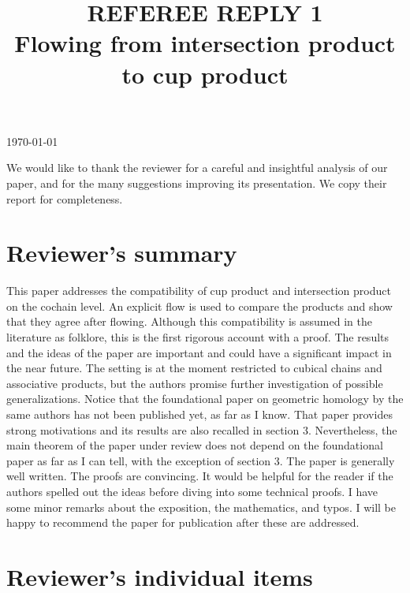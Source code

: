 \documentclass{amsart}
\title[Referee reply]{REFEREE REPLY 1 \\ Flowing from intersection product to cup product}
\begin{document}
\noindent\today
\maketitle

We would like to thank the reviewer for a careful and insightful analysis of our paper, and for the many suggestions improving its presentation.
We copy their report for completeness.

\section{Reviewer's summary}

\noindent This paper addresses the compatibility of cup product and intersection product on the cochain level. An explicit flow is used to compare the products and show that they agree after flowing. Although this compatibility is assumed in the literature as folklore, this is the first rigorous account with a proof. The results and the ideas of the paper are important and could have a significant impact in the near future. The setting is at the moment restricted to cubical chains and associative products, but the authors promise further investigation of possible generalizations. Notice that the foundational paper on geometric homology by the same authors has not been published yet, as far as I know. That paper provides strong motivations and its results are also recalled in section 3. Nevertheless, the main theorem of the paper under review does not depend on the foundational paper as far as I can tell, with the exception of section 3. The paper is generally well written. The proofs are convincing. It would be helpful for the reader if the authors spelled out the ideas before diving into some technical proofs. I have some minor remarks about the exposition, the mathematics, and typos. I will be happy to recommend the paper for publication after these are addressed.

\section{Reviewer's individual items}
\end{document}
